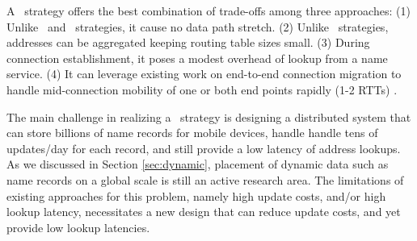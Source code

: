 {A  \logcen\ strategy offers the best combination of trade-offs among three approaches: 
(1) Unlike \indirection\ and  \namerouting\ strategies, it cause no data path stretch.
(2) Unlike \namerouting\ strategies,  addresses can be aggregated keeping routing table sizes small.
(3) During connection establishment, it poses a modest overhead of lookup from a name service.
(4) It can leverage existing work on  end-to-end connection migration to handle mid-connection mobility of one or both end points rapidly (1-2 RTTs)\cite{Migrate,ECCP,TCP-R} .

The main challenge in realizing  a \logcen\ strategy is designing a distributed system that can store billions of name records for mobile devices, handle handle tens of updates/day for each record, and still provide a low latency of address lookups. 
As we discussed in Section \ref{sec:dynamic}, placement of dynamic data such as name records on a global scale is still an active research area. The limitations of existing approaches for this problem, namely high update costs, and/or high lookup latency, necessitates a new design that can reduce update costs, and yet provide low lookup latencies.
}




